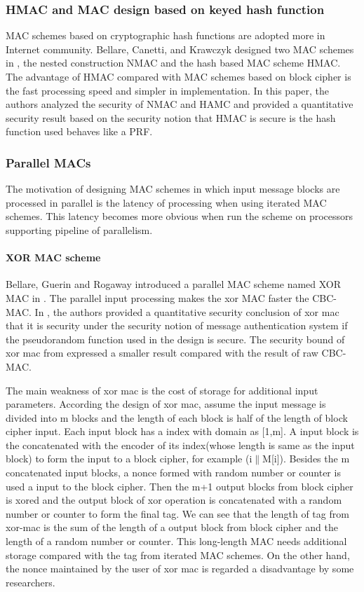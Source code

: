 \documentclass{article}
\begin{document}
\subsubsection{HMAC and MAC design based on keyed hash function}
MAC schemes based on cryptographic hash functions are adopted more in Internet community.
Bellare, Canetti, and Krawczyk designed two MAC schemes in \cite{hmac}, the nested construction NMAC and the hash based MAC scheme HMAC. The advantage of HMAC compared with MAC schemes based on block cipher is the fast processing speed and simpler in implementation. 
In this paper, the authors analyzed the security of NMAC and HAMC and provided a quantitative security result based on the security notion that HMAC is secure is the hash function used behaves like a PRF.  
\subsubsection{Parallel MACs}
The motivation of designing MAC schemes in which input message blocks are processed in parallel is the latency of processing when using iterated MAC schemes. This latency becomes more obvious when run the scheme on processors supporting pipeline of parallelism. 
\paragraph{XOR MAC scheme}
Bellare, Guerin and Rogaway introduced a parallel MAC scheme named XOR MAC in \cite{xor-mac}. 
The parallel input processing makes the xor MAC faster the CBC-MAC. 
In \cite{xor-mac}, the authors provided a quantitative security conclusion of xor mac that it is security under the security notion of message authentication system if the pseudorandom function used in the design is secure. The security bound of xor mac from \cite{xor-mac} expressed a smaller result compared with the result of raw CBC-MAC. 

The main weakness of xor mac is the cost of storage for additional input parameters. According the design of xor mac, assume the input message is divided into m blocks and the length of each block is half of the length of block cipher input. Each input block has a index with domain as [1,m]. A input block is the concatenated with the encoder of its index(whose length is same as the input block) to form the input to a block cipher, for example (i$\|$M[i]). Besides the m concatenated input blocks, a nonce formed with random number or counter is used a input to the block cipher. Then the m+1 output blocks from block cipher is xored and the output block of xor operation is concatenated with a random number or counter to form the final tag. 
We can see that the length of tag from xor-mac is the sum of the length of a output block from block cipher and the length of a random number or counter. This long-length MAC needs additional storage compared with the tag from iterated MAC schemes. 
On the other hand, the nonce maintained by the user of xor mac is regarded a disadvantage by some researchers.
\end{document}
